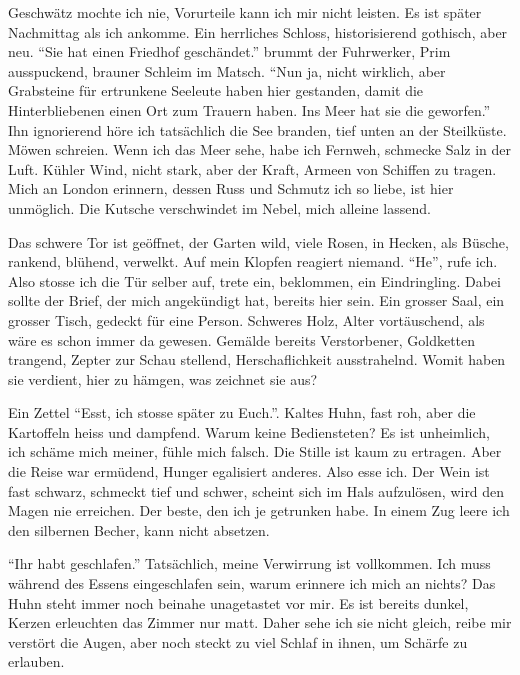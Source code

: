 Geschwätz mochte ich nie, Vorurteile kann ich mir nicht leisten. Es ist später Nachmittag als ich ankomme. Ein herrliches Schloss, historisierend gothisch, aber neu. \enquote{Sie hat einen Friedhof geschändet.} brummt der Fuhrwerker, Prim ausspuckend, brauner Schleim im Matsch. \enquote{Nun ja, nicht wirklich, aber Grabsteine für ertrunkene Seeleute haben hier gestanden, damit die Hinterbliebenen einen Ort zum Trauern haben. Ins Meer hat sie die geworfen.} Ihn ignorierend höre ich tatsächlich die See branden, tief unten an der Steilküste. Möwen schreien. Wenn ich das Meer sehe, habe ich Fernweh, schmecke Salz in der Luft. Kühler Wind, nicht stark, aber der Kraft, Armeen von Schiffen zu tragen. Mich an London erinnern, dessen Russ und Schmutz ich so liebe, ist hier unmöglich. Die Kutsche verschwindet im Nebel, mich alleine lassend.

Das schwere Tor ist geöffnet, der Garten wild, viele Rosen, in Hecken, als Büsche, rankend, blühend, verwelkt. Auf mein Klopfen reagiert niemand. \enquote{He}, rufe ich. Also stosse ich die Tür selber auf, trete ein, beklommen, ein Eindringling. Dabei sollte der Brief, der mich angekündigt hat, bereits hier sein. Ein grosser Saal, ein grosser Tisch, gedeckt für eine Person. Schweres Holz, Alter vortäuschend, als wäre es schon immer da gewesen. Gemälde bereits Verstorbener, Goldketten trangend, Zepter zur Schau stellend, Herschaflichkeit ausstrahelnd. Womit haben sie verdient, hier zu hämgen, was zeichnet sie aus?


Ein Zettel \enquote{Esst, ich stosse später zu Euch.}. Kaltes Huhn, fast roh, aber die Kartoffeln heiss und dampfend. Warum keine Bediensteten? Es ist unheimlich, ich schäme mich meiner, fühle mich falsch. Die Stille ist kaum zu ertragen. Aber die Reise war ermüdend, Hunger egalisiert anderes. Also esse ich. Der Wein ist fast schwarz, schmeckt tief und schwer, scheint sich im Hals aufzulösen, wird den Magen nie erreichen. Der beste, den ich je getrunken habe. In einem Zug leere ich den silbernen Becher, kann nicht absetzen.

\enquote{Ihr habt geschlafen.} Tatsächlich, meine Verwirrung ist vollkommen. Ich muss während des Essens eingeschlafen sein, warum erinnere ich mich an nichts? Das Huhn steht immer noch beinahe unagetastet vor mir. Es ist bereits dunkel, Kerzen erleuchten das Zimmer nur matt. Daher sehe ich sie nicht gleich, reibe mir verstört die Augen, aber noch steckt zu viel Schlaf in ihnen, um Schärfe zu erlauben.\hfill {\color{farbe}\decofourleft}\newpage 

